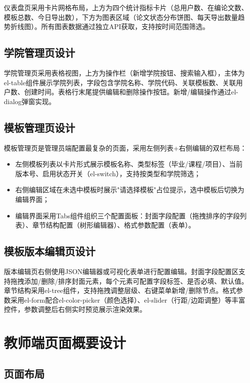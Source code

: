 \documentclass{../softeng}
\begin{document}
仪表盘页采用卡片网格布局，上方为四个统计指标卡片（总用户数、在编论文数、模板总数、今日导出数），下方为图表区域（论文状态分布饼图、每天导出数量趋势折线图）。所有图表数据通过独立API获取，支持按时间范围筛选。

\subsection{学院管理页设计}

学院管理页采用表格视图，上方为操作栏（新增学院按钮、搜索输入框），主体为el-table组件展示学院列表，字段包含学院名称、学院代码、关联模板数、关联用户数、创建时间。表格行末尾提供编辑和删除操作按钮。新增/编辑操作通过el-dialog弹窗实现。

\subsection{模板管理页设计}

模板管理页是管理员端配置最复杂的页面，采用左侧列表+右侧编辑的双栏布局：
\begin{itemize}
    \item 左侧模板列表以卡片形式展示模板名称、类型标签（毕业/课程/项目）、当前版本号、启用状态开关（el-switch），支持按类型和学院筛选；
    \item 右侧编辑区域在未选中模板时展示"请选择模板"占位提示，选中模板后切换为编辑界面；
    \item 编辑界面采用Tabs组件组织三个配置面板：封面字段配置（拖拽排序的字段列表）、章节结构配置（树形编辑器）、格式参数配置（表单）。
\end{itemize}

\subsection{模板版本编辑页设计}

版本编辑页右侧使用JSON编辑器或可视化表单进行配置编辑。封面字段配置区支持拖拽添加/删除/排序封面元素，每个元素可配置字段标签、是否必填、默认值。章节结构采用el-tree组件，支持拖拽调整层级、右键菜单新增/删除节点。格式参数采用el-form配合el-color-picker（颜色选择）、el-slider（行距/边距调整）等丰富控件，参数调整后右侧实时预览展示渲染效果。

\section{教师端页面概要设计}

\subsection{页面布局}
\end{document}
